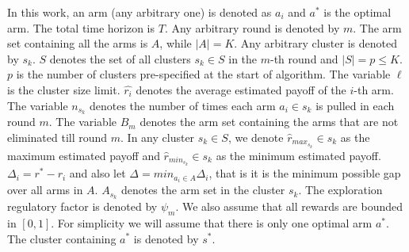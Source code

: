 In this work, an arm (any arbitrary one) is denoted as $a_{i}$ and $a^{*}$ is the optimal arm. The total time horizon is $T$. Any arbitrary round is denoted by $m$. The arm set containing all the arms is $A$, while $|A|=K$. Any arbitrary cluster is denoted by $s_{k}$. $S$ denotes the set of all clusters $s_{k}\in S$ in the $m$-th round and $|S|=p\leq K$. $p$ is the number of clusters pre-specified at the start of algorithm. The variable $\ell$ is the cluster size limit.
$\hat{r_i}$ denotes the average estimated payoff of the $i$-th arm. The variable $n_{s_{k}}$ denotes the number of times each arm $a_{i}\in s_{k}$ is pulled in each round $m$. The variable $B_{m}$ denotes the arm set containing the arms that are not eliminated till round $m$.
	In any cluster $s_{k}\in S$, we denote $\hat{r}_{max_{s_{k}}}\in s_{k}$ as the maximum estimated payoff and $\hat{r}_{min_{s_{k}}}\in s_{k}$ as the minimum estimated payoff. $\Delta_{i}=r^{*}-r_{i}$ and also let $\Delta=min_{a_{i}\in A}\Delta_{i}$, that is it is the minimum possible gap over all arms in $A$. $A_{s_{k}}$ denotes the arm set in the cluster $s_{k}$. The exploration regulatory factor is denoted by $\psi_{m}$. %
We also assume that all rewards are bounded in $[0,1]$. For simplicity we will assume that there is only one optimal arm $a^{*}$. The cluster containing $a^{*}$ is denoted by $s^{*}$.
